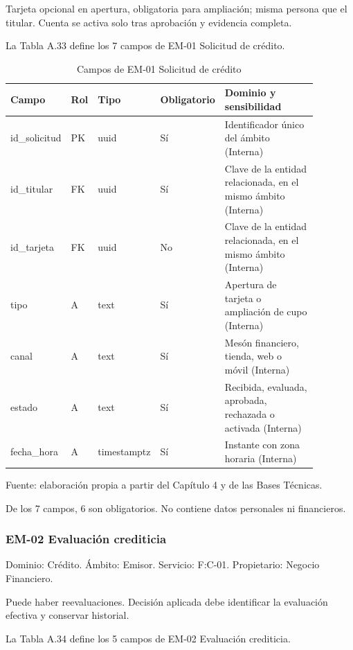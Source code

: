 \documentclass[11pt]{article}
\begin{document}
Tarjeta opcional en apertura, obligatoria para ampliación; misma persona que el titular. Cuenta se activa solo tras aprobación y evidencia completa.

La Tabla A.33 define los 7 campos de EM-01 Solicitud de crédito.

\begin{table}[htbp]
\caption{Campos de EM-01 Solicitud de crédito}\label{tab:d_em01}
\centering
\begin{tabular}{@{}p{0.167\linewidth}p{0.070\linewidth}p{0.079\linewidth}p{0.097\linewidth}p{0.465\linewidth}@{}}
\toprule Campo & Rol & Tipo & Obligatorio & Dominio y sensibilidad \\
\midrule
id\_solicitud & PK & uuid & Sí & Identificador único del ámbito (Interna) \\
id\_titular & FK & uuid & Sí & Clave de la entidad relacionada, en el mismo ámbito (Interna) \\
id\_tarjeta & FK & uuid & No & Clave de la entidad relacionada, en el mismo ámbito (Interna) \\
tipo & A & text & Sí & Apertura de tarjeta o ampliación de cupo (Interna) \\
canal & A & text & Sí & Mesón financiero, tienda, web o móvil (Interna) \\
estado & A & text & Sí & Recibida, evaluada, aprobada, rechazada o activada (Interna) \\
fecha\_hora & A & timestamptz & Sí & Instante con zona horaria (Interna) \\
\bottomrule
\end{tabular}
\par\smallskip
{\raggedright Fuente: elaboración propia a partir del Capítulo 4 y de las Bases Técnicas.\par}
\end{table}


De los 7 campos, 6 son obligatorios. No contiene datos personales ni financieros.

\subsubsection{EM-02 Evaluación crediticia}

Dominio: Crédito. Ámbito: Emisor. Servicio: F:C-01. Propietario: Negocio Financiero.

Puede haber reevaluaciones. Decisión aplicada debe identificar la evaluación efectiva y conservar historial.

La Tabla A.34 define los 5 campos de EM-02 Evaluación crediticia.
\end{document}
